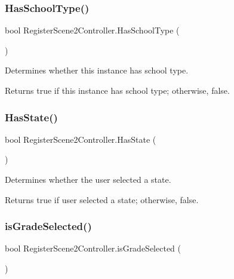 \subsubsection{\texorpdfstring{Has\+School\+Type()}{HasSchoolType()}}
{\footnotesize\ttfamily bool Register\+Scene2\+Controller.\+Has\+School\+Type (\begin{DoxyParamCaption}{ }\end{DoxyParamCaption})\hspace{0.3cm}{\ttfamily [inline]}}



Determines whether this instance has school type. 

\begin{DoxyReturn}{Returns}
{\ttfamily true} if this instance has school type; otherwise, {\ttfamily false}.
\end{DoxyReturn}
\mbox{\label{classRegisterScene2Controller_a9f35a4fccc3c148375a02c18768e3d0a}} 
\subsubsection{\texorpdfstring{Has\+State()}{HasState()}}
{\footnotesize\ttfamily bool Register\+Scene2\+Controller.\+Has\+State (\begin{DoxyParamCaption}{ }\end{DoxyParamCaption})\hspace{0.3cm}{\ttfamily [inline]}}



Determines whether the user selected a state. 

\begin{DoxyReturn}{Returns}
{\ttfamily true} if user selected a state; otherwise, {\ttfamily false}.
\end{DoxyReturn}
\mbox{\label{classRegisterScene2Controller_ac9bd10a18788e75916facefbb141cd8c}} 
\subsubsection{\texorpdfstring{is\+Grade\+Selected()}{isGradeSelected()}}
{\footnotesize\ttfamily bool Register\+Scene2\+Controller.\+is\+Grade\+Selected (\begin{DoxyParamCaption}{ }\end{DoxyParamCaption})\hspace{0.3cm}{\ttfamily [inline]}}



